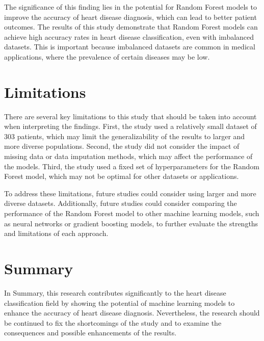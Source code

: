 The significance of this finding lies in the potential for Random Forest models to improve the accuracy of heart disease diagnosis, which can lead to better patient outcomes. The results of this study demonstrate that Random Forest models can achieve high accuracy rates in heart disease classification, even with imbalanced datasets. This is important because imbalanced datasets are common in medical applications, where the prevalence of certain diseases may be low.

\section{Limitations}  
There are several key limitations to this study that should be taken into account when interpreting the findings. First, the study used a relatively small dataset of 303 patients, which may limit the generalizability of the results to larger and more diverse populations. Second, the study did not consider the impact of missing data or data imputation methods, which may affect the performance of the models. Third, the study used a fixed set of hyperparameters for the Random Forest model, which may not be optimal for other datasets or applications.


To address these limitations, future studies could consider using larger and more diverse datasets. Additionally, future studies could consider comparing the performance of the Random Forest model to other machine learning models, such as neural networks or gradient boosting models, to further evaluate the strengths and limitations of each approach.
\section{Summary}
In Summary, this research contributes significantly to the heart disease classification field by showing the potential of machine learning models to enhance the accuracy of heart disease diagnosis. Nevertheless, the research should be continued to fix the shortcomings of the study and to examine the consequences and possible enhancements of the results.
